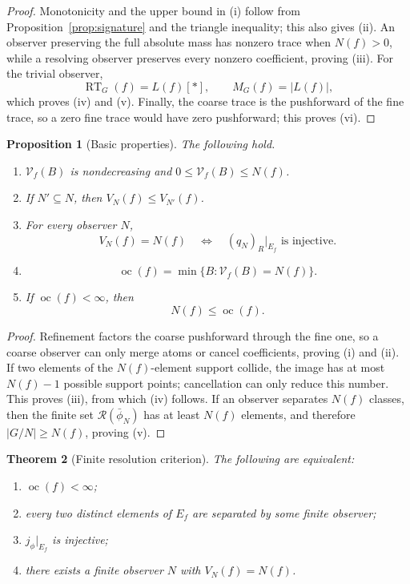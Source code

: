 \documentclass[11pt]{article}
\newtheorem{theorem}{Theorem}[section]
\newtheorem{proposition}[theorem]{Proposition}
\DeclareMathOperator{\oc}{oc}
\newcommand{\RT}{\operatorname{RT}}
\newcommand{\RN}{\mathcal R}
\newcommand{\VN}{\mathcal V}
\begin{document}
\begin{proof}
Monotonicity and the upper bound in (i) follow from
Proposition~\ref{prop:signature} and the triangle inequality; this also gives
(ii).  An observer preserving the full absolute mass has nonzero trace when
$N(f)>0$, while a resolving observer preserves every nonzero coefficient,
proving (iii).  For the trivial observer,
\[
  \RT_G(f)=L(f)[*],\qquad M_G(f)=|L(f)|,
\]
which proves (iv) and (v).  Finally, the coarse trace is the pushforward of
the fine trace, so a zero fine trace would have zero pushforward; this proves
(vi).
\end{proof}

\begin{proposition}[Basic properties]
\label{prop:basic}
The following hold.
\begin{enumerate}[label=(\roman*)]
\item $\VN_f(B)$ is nondecreasing and $0\le\VN_f(B)\le N(f)$.
\item If $N'\subseteq N$, then $V_N(f)\le V_{N'}(f)$.
\item For every observer $N$,
      \[
        V_N(f)=N(f)
        \quad\Longleftrightarrow\quad
        (q_N)_R|_{E_f}\text{ is injective}.
      \]
\item
      \[
        \oc(f)=\min\{B:\VN_f(B)=N(f)\}.
      \]
\item If $\oc(f)<\infty$, then
      \[
        N(f)\le\oc(f).
      \]
\end{enumerate}
\end{proposition}

\begin{proof}
Refinement factors the coarse pushforward through the fine one, so a coarse
observer can only merge atoms or cancel coefficients, proving (i) and (ii).
If two elements of the $N(f)$-element support collide, the image has at most
$N(f)-1$ possible support points; cancellation can only reduce this number.
This proves (iii), from which (iv) follows.  If an observer separates $N(f)$
classes, then the finite set $\RN(\bar\phi_N)$ has at least $N(f)$ elements,
and therefore $|G/N|\ge N(f)$, proving (v).
\end{proof}

\begin{theorem}[Finite resolution criterion]
\label{thm:resolutioncriterion}
The following are equivalent:
\begin{enumerate}[label=(\alph*)]
\item $\oc(f)<\infty$;
\item every two distinct elements of $E_f$ are separated by some finite
      observer;
\item $j_\phi|_{E_f}$ is injective;
\item there exists a finite observer $N$ with $V_N(f)=N(f)$.
\end{enumerate}
\end{theorem}
\end{document}
